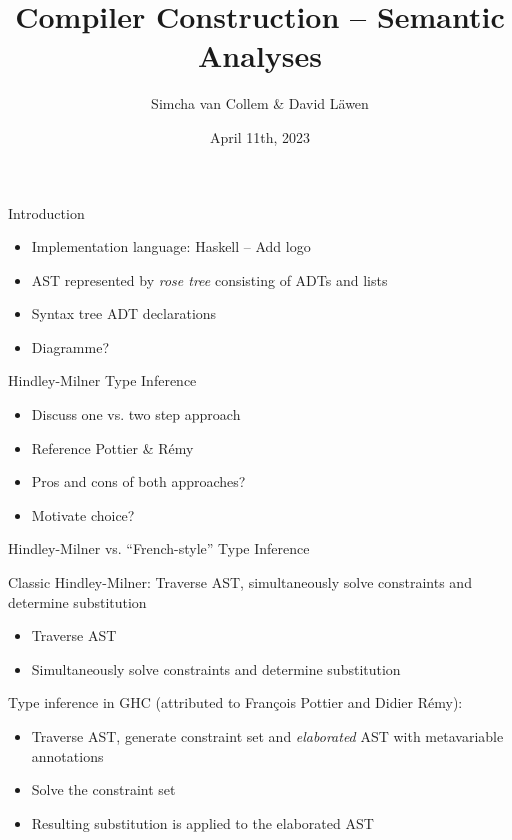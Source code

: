 \documentclass[dvipsnames,aspectratio=169]{beamer}
\title[Compiler Construction -- Phase 2]%
{Compiler Construction -- Semantic Analyses}
\subtitle
{}
\author%
{Simcha van Collem \& David Läwen}
\institute[]%
{MFoCS Seminar}
\date[April 11th, 2023] %
{April 11th, 2023}
\begin{document}
\begin{frame}
  \titlepage
\end{frame}

\begin{frame}{Introduction}

  \begin{itemize}
    \item Implementation language: Haskell -- Add logo
    \item AST represented by \emph{rose tree} consisting of ADTs and lists
    \item Syntax tree ADT declarations
    \item Diagramme?
  \end{itemize}

\end{frame}


\begin{frame}{Hindley-Milner Type Inference}

  \begin{itemize}
    \item Discuss one vs. two step approach
    \item Reference Pottier \& Rémy
    \item Pros and cons of both approaches?
    \item Motivate choice?
  \end{itemize}

\end{frame}


\begin{frame}{Hindley-Milner vs. ``French-style'' Type Inference}

  Classic Hindley-Milner: Traverse AST, simultaneously solve constraints
  and determine substitution
  \begin{itemize}
    \item Traverse AST
    \item Simultaneously solve constraints and determine substitution
  \end{itemize}
  Type inference in GHC (attributed to François Pottier and Didier Rémy):
  \begin{itemize}
    \item Traverse AST, generate constraint set and \emph{elaborated} AST with
          metavariable annotations
    \item Solve the constraint set
    \item Resulting substitution is applied to the elaborated AST
  \end{itemize}

\end{frame}
\end{document}

